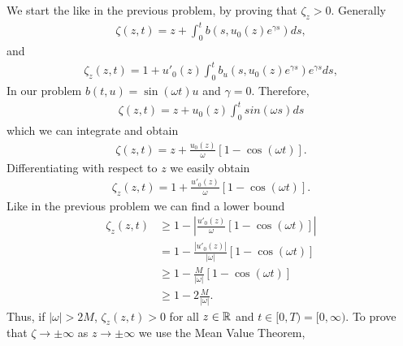 \begin{questions}

\begin{solution}
We start the like in the previous problem, by proving that $\zeta_z>0$. Generally
\begin{align*}
\zeta(z,t)=z+\int_0^tb\left(s,u_0(z)e^{\gamma s}\right)ds,
\end{align*}
and
\begin{align*}
\zeta_z(z,t)=1+u'_0(z)\int_0^tb_u\left(s,u_0(z)e^{\gamma s}\right)e^{\gamma s}ds,
\end{align*}
In our problem $b(t,u)=\sin{(\omega t)}u$ and $\gamma=0$. Therefore,
\begin{align*}
\zeta(z,t)=z+u_0(z)\int_0^tsin{(\omega s)}ds
\end{align*}
which we can integrate and obtain
\begin{align*}
\zeta(z,t)=z+\frac{u_0(z)}{\omega}\left[1-\cos{(\omega t)}\right].
\end{align*}
Differentiating with respect to $z$ we easily obtain
\begin{align*}
\zeta_z(z,t)=1+\frac{u'_0(z)}{\omega}\left[1-\cos{(\omega t)}\right].
\end{align*}
Like in the previous problem we can find a lower bound
\begin{align*}
\zeta_z(z,t)&\geq1-\left|\frac{u'_0(z)}{\omega}\left[1-\cos{(\omega t)}\right]\right|\\
&=1-\frac{\left|u'_0(z)\right|}{\left|\omega\right|}\left[1-\cos{(\omega t)}\right]\\
&\geq1-\frac{M}{\left|\omega\right|}\left[1-\cos{(\omega t)}\right]\\
&\geq1-2\frac{M}{\left|\omega\right|}.
\end{align*}
Thus, if $|\omega|>2M$, $\zeta_z(z,t)>0$ for all $z\in\mathbb{R}$ and $t\in[0,T)=[0,\infty)$. To prove that $\zeta\rightarrow\pm\infty$ as $z\rightarrow\pm\infty$ we use the Mean Value Theorem,

\end{solution}
\end{questions}
